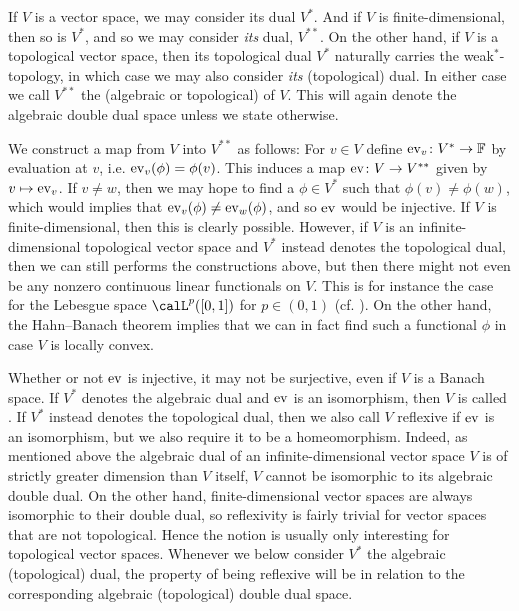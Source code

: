 If $V$ is a vector space, we may consider its dual $V^*$. And if $V$ is finite-dimensional, then so is $V^*$, and so we may consider \emph{its} dual, $V^{**}$. On the other hand, if $V$ is a topological vector space, then its topological dual $V^*$ naturally carries the weak$^*$-topology, in which case we may also consider \emph{its} (topological) dual. In either case we call $V^{**}$ the (algebraic or topological)  of $V$. This will again denote the algebraic double dual space unless we state otherwise.

We construct a map from $V$ into $V^{**}$ as follows: For $v \in V$ define $\mathrm{ev}_v \colon V^* \to \mathbb{F}$ by evaluation at $v$, i.e. $\ev_v(\phi) = \phi(v)$. This induces a map $\mathrm{ev} \colon V \to V^{**}$ given by $v \mapsto \mathrm{ev}_v$. If $v \neq w$, then we may hope to find a $\phi \in V^*$ such that $\phi(v) \neq \phi(w)$, which would implies that $\ev_v(\phi) \neq \ev_w(\phi)$, and so $\mathrm{ev}$ would be injective. If $V$ is finite-dimensional, then this is clearly possible. However, if $V$ is an infinite-dimensional topological vector space and $V^*$ instead denotes the topological dual, then we can still performs the constructions above, but then there might not even be any nonzero continuous linear functionals on $V$. This is for instance the case for the Lebesgue space $\calL^p([0,1])$ for $p \in (0,1)$ (cf. \cite[§1.47]{rudinfunctional}). On the other hand, the Hahn--Banach theorem implies that we can in fact find such a functional $\phi$ in case $V$ is locally convex.

Whether or not $\mathrm{ev}$ is injective, it may not be surjective, even if $V$ is a Banach space. If $V^*$ denotes the algebraic dual and $\mathrm{ev}$ is an isomorphism, then $V$ is called . If $V^*$ instead denotes the topological dual, then we also call $V$ reflexive if $\mathrm{ev}$ is an isomorphism, but we also require it to be a homeomorphism. Indeed, as mentioned above the algebraic dual of an infinite-dimensional vector space $V$ is of strictly greater dimension than $V$ itself, $V$ cannot be isomorphic to its algebraic double dual. On the other hand, finite-dimensional vector spaces are always isomorphic to their double dual, so reflexivity is fairly trivial for vector spaces that are not topological. Hence the notion is usually only interesting for topological vector spaces. Whenever we below consider $V^*$ the algebraic (topological) dual, the property of being reflexive will be in relation to the corresponding algebraic (topological) double dual space.

